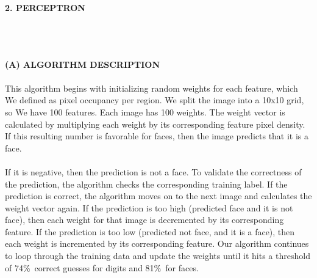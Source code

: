 \documentclass[10 pt]{report}   	%
\begin{document}
{\Large \textbf {\\ \\2. PERCEPTRON\\ \\}}

\large {\\ \\\textbf {(A) ALGORITHM DESCRIPTION} \\ \\
This algorithm begins with initializing random weights for each feature, which We defined as pixel occupancy per region. We split the image into a 10x10 grid, so We have 100 features. Each image has 100 weights. The weight vector is calculated by multiplying each weight by its corresponding feature pixel density. 
If this resulting number is favorable for faces, then the image predicts that it is a face. \\ \\
If it is negative, then the prediction is not a face. To validate the correctness of the prediction, the algorithm checks the corresponding training label. 
If the prediction is correct, the algorithm moves on to the next image and calculates the weight vector again. If the prediction is too high (predicted face and it is not face), then each weight for that image is decremented by its corresponding feature. If the prediction is too low (predicted not face, and it is a face), then each weight is incremented by its corresponding feature. Our algorithm continues to loop through the training data and update the weights until it hits a threshold of 74\%\ correct guesses for digits and 81\%\ for faces. \\ 

}
\end{document}
